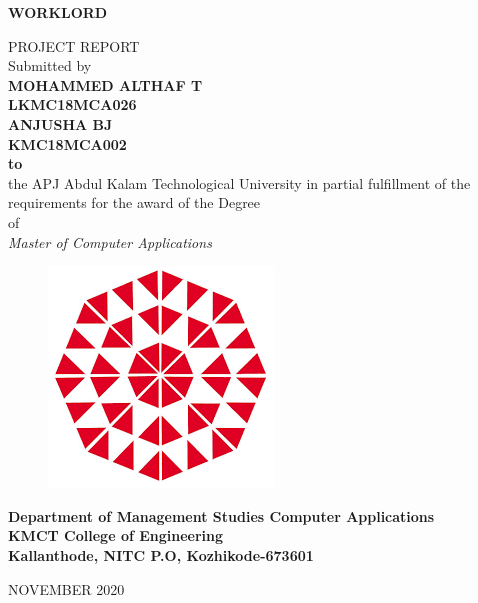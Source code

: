 \documentclass[a4paper,12pt]{report}
\begin{document}
{\centering \bf \large
	WORKLORD\par
}
\begin{center}
	{\small PROJECT REPORT} \vspace*{10pt}
	\\ Submitted by\\
	\vspace*{15pt}
	{\bf MOHAMMED ALTHAF T\\
\vspace*{8pt}	LKMC18MCA026\\

\vspace*{8pt}ANJUSHA BJ\\
\vspace*{8pt}KMC18MCA002\\
	\vspace*{20pt}
	to}\\
	\vspace*{13pt}
	the APJ Abdul Kalam Technological University in partial fulfillment of
	the requirements for the award of the Degree\\
	\vspace*{10pt} of\\
	\vspace*{10pt} \textit{ Master of Computer Applications
	} 
\vspace*{10pt}
\begin{figure}[bph]
	\centering
	\includegraphics[width=0.3023\linewidth]{kmct}
	\label{fig:ksblogo}
\end{figure}

	\bf{Department of Management Studies  Computer Applications
	\vspace*{15pt}
	\\KMCT College of Engineering
	\vspace*{10pt}
	\\Kallanthode, NITC P.O, Kozhikode-673601}

\end{center}
	\begin{center}
		\vspace*{15pt}NOVEMBER 2020
	\end{center}
\end{document}
